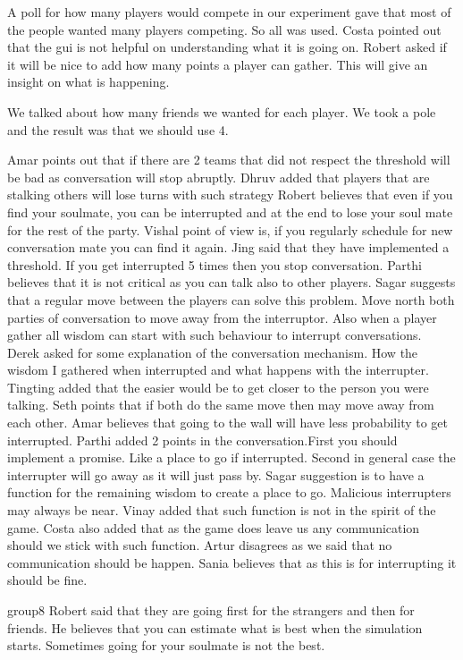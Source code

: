 A poll for how many players would compete in our experiment gave that most of the people wanted many players competing. So all was used.
Costa pointed out that the gui is not helpful on understanding what it is going on.
Robert asked if it will be nice to add how many points a player can gather. This will give an insight on what is happening.

We talked about how many friends we wanted for each player.
We took a pole and the result was that we should use 4.

Amar points out that if there are 2 teams that did not respect the threshold will be bad as conversation will stop abruptly.
Dhruv added that players that are stalking others will lose turns with such strategy
Robert believes that even if you find your soulmate, you can be interrupted and at the end to lose your soul mate for the rest of the party.
Vishal point of view is, if you regularly schedule for new conversation mate you can find it again.
Jing said that they have implemented a threshold. If you get interrupted 5 times then you stop conversation.
Parthi believes that it is not critical as you can talk also to other players.
Sagar suggests that a regular move between the players can solve this problem. Move north both parties of conversation to move away from the interruptor. Also when a player gather all wisdom can start with such behaviour to interrupt conversations.
Derek asked for some explanation of the conversation mechanism. How the wisdom I gathered when interrupted and what happens with the interrupter. 
Tingting added that the easier would be to get closer to the person you were talking.
Seth points that if both do the same move then may move away from each other.
Amar believes that going to the wall will have less probability to get interrupted.
Parthi added 2 points in the conversation.First you should implement a promise. Like a place to go if interrupted. Second in general case the interrupter will go away as it will just pass by.
Sagar suggestion is to have a function for the remaining wisdom to create a place to go. Malicious interrupters may always be near. 
Vinay added that such function is not in the spirit of the game.
Costa also added that as the game does leave us any communication should we stick with such function.
Artur disagrees as we said that no communication should be happen.
Sania believes that as this is for interrupting it should be fine.

group8
Robert said that they are going first for the strangers and then for friends. He believes that you can estimate what is best when the simulation starts. Sometimes going for your soulmate is not the best.

